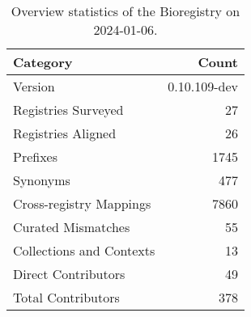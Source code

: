 \begin{table}
\caption{Overview statistics of the Bioregistry on 2024-01-06.}
\label{tab:bioregistry-summary}
\begin{tabular}{lr}
\toprule
Category & Count \\
\midrule
Version & 0.10.109-dev \\
Registries Surveyed & 27 \\
Registries Aligned & 26 \\
Prefixes & 1745 \\
Synonyms & 477 \\
Cross-registry Mappings & 7860 \\
Curated Mismatches & 55 \\
Collections and Contexts & 13 \\
Direct Contributors & 49 \\
Total Contributors & 378 \\
\bottomrule
\end{tabular}
\end{table}
